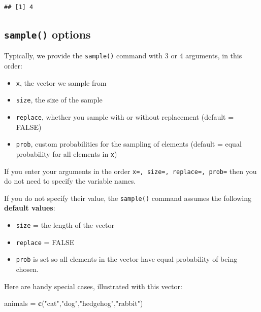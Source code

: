 \documentclass[
]{book}
\newenvironment{Shaded}{\begin{snugshade}}{\end{snugshade}}
\newcommand{\FunctionTok}[1]{\textcolor[rgb]{0.13,0.29,0.53}{\textbf{#1}}}
\newcommand{\NormalTok}[1]{#1}
\newcommand{\OtherTok}[1]{\textcolor[rgb]{0.56,0.35,0.01}{#1}}
\newcommand{\StringTok}[1]{\textcolor[rgb]{0.31,0.60,0.02}{#1}}
\providecommand{\tightlist}{%
  \setlength{\itemsep}{0pt}\setlength{\parskip}{0pt}}
\theoremstyle{definition}
\theoremstyle{definition}
\theoremstyle{definition}
\theoremstyle{definition}
\theoremstyle{remark}
\begin{document}
\begin{verbatim}
## [1] 4
\end{verbatim}

\subsection*{\texorpdfstring{\texttt{sample()} options}{sample() options}}\label{sample-options}

Typically, we provide the \texttt{sample()} command with 3 or 4 arguments, in this order:

\begin{itemize}
\tightlist
\item
  \texttt{x}, the vector we sample from
\item
  \texttt{size}, the size of the sample
\item
  \texttt{replace}, whether you sample with or without replacement (default = FALSE)
\item
  \texttt{prob}, custom probabilities for the sampling of elements (default = equal probability for all elements in \texttt{x})
\end{itemize}

If you enter your arguments in the order \texttt{x=,\ size=,\ replace=,\ prob=} then you do not need to specify the variable names.

If you do not specify their value, the \texttt{sample()} command assumes the following \textbf{default values}:

\begin{itemize}
\tightlist
\item
  \texttt{size} = the length of the vector
\item
  \texttt{replace} = FALSE
\item
  \texttt{prob} is set so all elements in the vector have equal probability of being chosen.
\end{itemize}

Here are handy special cases, illustrated with this vector:

\begin{Shaded}
\begin{Highlighting}[]
\NormalTok{animals }\OtherTok{=} \FunctionTok{c}\NormalTok{(}\StringTok{"cat"}\NormalTok{,}\StringTok{"dog"}\NormalTok{,}\StringTok{"hedgehog"}\NormalTok{,}\StringTok{"rabbit"}\NormalTok{)}
\end{Highlighting}
\end{Shaded}
\end{document}
